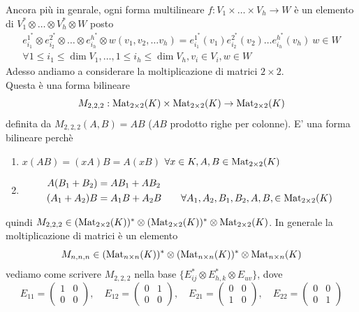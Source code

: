 \documentclass[../main.tex]{subfiles}
\begin{document}
Ancora più in genrale, ogni forma multilineare $f: V_1 \times \ldots \times V_h \rightarrow W$ è un elemento di $V_1^* \otimes \ldots \otimes V_h^* \otimes W$ posto
\begin{gather*}
    e_{i_1}^{1^*} \otimes e_{i_2}^{2^*} \otimes \ldots \otimes e_{i_h}^{h^*} \otimes w (v_1, v_2, \ldots v_h) = e_{i_1}^{1^*}(v_1)e_{i_2}^{2^*}(v_2) \ldots e_{i_h}^{h^*}(v_h) \: w \in W\\
    \forall 1 \leq i_1 \leq \dim V_1, \ldots, 1 \leq i_h \leq \dim V_h, v_i \in V_i, w \in W
\end{gather*}
Adesso andiamo a considerare la moltiplicazione di matrici $2 \times 2$.\\
Questa è una forma bilineare
\begin{equation*}
    M_{2,2,2} : \operatorname{Mat}_{2 \times 2} (K) \times \operatorname{Mat}_{2 \times 2} (K) \rightarrow \operatorname{Mat}_{2 \times 2} (K)
\end{equation*}
definita da $M_{2,2,2}(A,B)= AB$ ($AB$ prodotto righe per colonne). E' una forma bilineare perchè
\begin{enumerate}
    \item $x(AB) = (xA)B = A(xB)$ $\forall x \in K, A,B \in \operatorname{Mat}_{2 \times 2} (K)$
    \item  \begin{align*}
              A(B_1 + B_2) & = AB_1 + AB_2                                                                    \\
              (A_1 + A_2)B & = A_1B + A_2B \qquad \forall A_1, A_2, B_1, B_2, A, B, \in \operatorname{Mat}_{2 \times 2} (K)
          \end{align*}
\end{enumerate}
quindi $M_{2,2,2} \in (\operatorname{Mat}_{2 \times 2} (K))^* \otimes (\operatorname{Mat}_{2 \times 2} (K))^* \otimes \operatorname{Mat}_{2 \times 2} (K)$. In generale la moltiplicazione di matrici è un elemento
\begin{equation*}
    M_{n,n,n} \in (\operatorname{Mat}_{n \times n} (K))^* \otimes (\operatorname{Mat}_{n \times n} (K))^* \otimes \operatorname{Mat}_{n \times n} (K)
\end{equation*}
vediamo come scrivere $M_{2,2,2}$ nella base $\{E_{ij}^* \otimes E_{h,k}^* \otimes E_{uv}\}$, dove
\begin{equation*}
    E_{11} = \begin{pmatrix}
        1 & 0 \\
        0 & 0
    \end{pmatrix}, \quad
    E_{12} = \begin{pmatrix}
        0 & 1 \\
        0 & 0
    \end{pmatrix}, \quad
    E_{21} = \begin{pmatrix}
        0 & 0 \\
        1 & 0
    \end{pmatrix}, \quad
    E_{22} = \begin{pmatrix}
        0 & 0 \\
        0 & 1
    \end{pmatrix}
\end{equation*}
\end{document}

